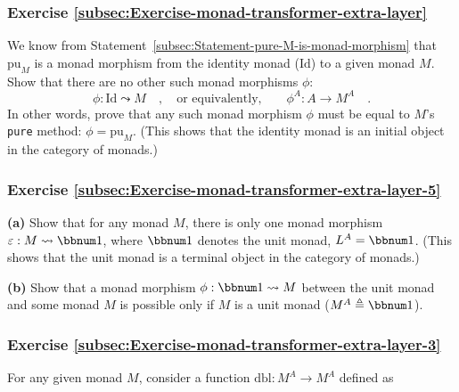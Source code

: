 \subsubsection{Exercise \label{subsec:Exercise-monad-transformer-extra-layer}\ref{subsec:Exercise-monad-transformer-extra-layer} }

We know from Statement~\ref{subsec:Statement-pure-M-is-monad-morphism}
that $\text{pu}_{M}$ is a monad morphism from the identity monad
($\text{Id}$) to a given monad $M$. Show that there are no other
such monad morphisms $\phi$:
\[
\phi:\text{Id}\leadsto M\quad,\quad\text{or equivalently,}\quad\quad\phi^{A}:A\rightarrow M^{A}\quad.
\]
In other words, prove that any such monad morphism $\phi$ must be
equal to $M$\textsf{'}s \lstinline!pure! method: $\phi=\text{pu}_{M}$. (This
shows that the identity monad is an initial object in the category
of monads.)%
\begin{comment}
Solution:

The identity law of monad morphisms is
\[
\text{pu}_{\text{Id}}\bef\phi=\text{pu}_{M}\quad.
\]
Since $\text{pu}_{\text{Id}}=\text{id}$, we obtain $\phi=\text{pu}_{M}$.
There can be no other monad morphisms $\text{Id}\leadsto M$.
\end{comment}


\subsubsection{Exercise \label{subsec:Exercise-monad-transformer-extra-layer-5}\ref{subsec:Exercise-monad-transformer-extra-layer-5}}

\textbf{(a)} Show that for any monad $M$, there is only one monad
morphism $\varepsilon:M\leadsto\bbnum 1$, where $\bbnum 1$ denotes
the unit monad, $L^{A}=\bbnum 1$. (This shows that the unit monad
is a terminal object in the category of monads.)

\textbf{(b)} Show that a monad morphism $\phi:\bbnum 1\leadsto M$
between the unit monad and some monad $M$ is possible only if $M$
is a unit monad ($M^{A}\triangleq\bbnum 1$).

\subsubsection{Exercise \label{subsec:Exercise-monad-transformer-extra-layer-3}\ref{subsec:Exercise-monad-transformer-extra-layer-3}}

For any given monad $M$, consider a function $\text{dbl}:M^{A}\rightarrow M^{A}$
defined as

